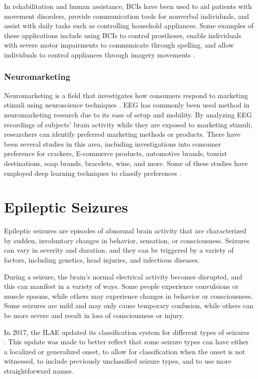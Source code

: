 In rehabilitation and human assistance, \glspl{BCI} have been used to aid patients with movement disorders, provide communication tools for nonverbal individuals, and assist with daily tasks such as controlling household appliances. Some examples of these applications include using \glspl{BCI} to control prostheses, enable individuals with severe motor impairments to communicate through spelling, and allow individuals to control appliances through imagery movements \cite{robinson_adaptive_2015}.

\subsubsection{Neuromarketing}
Neuromarketing is a field that investigates how consumers respond to marketing stimuli using neuroscience techniques \cite{lai_literature_2018}. 
\gls{EEG} has commonly been used method in neuromarketing research due to its ease of setup and mobility. By analyzing \gls{EEG} recordings of subjects' brain activity while they are exposed to marketing stimuli, researchers can identify preferred marketing methods or products. There have been several studies in this area, including investigations into consumer preference for crackers, E-commerce products, automotive brands, tourist destinations, soap brands, bracelets, wine, and more. Some of these studies have employed deep learning techniques to classify preferences \cite{bazzani_is_2020, khurana_survey_2021}.


\section{Epileptic Seizures}
Epileptic seizures are episodes of abnormal brain activity that are characterized by sudden, involuntary changes in behavior, sensation, or consciousness. Seizures can vary in severity and duration, and they can be triggered by a variety of factors, including genetics, head injuries, and infectious diseases.

During a seizure, the brain's normal electrical activity becomes disrupted, and this can manifest in a variety of ways. Some people experience convulsions or muscle spasms, while others may experience changes in behavior or consciousness. Some seizures are mild and may only cause temporary confusion, while others can be more severe and result in loss of consciousness or injury.

In 2017, the \gls{ILAE} updated its classification system for different types of seizures \cite{fisher_instruction_2017, fisher_operational_2017}. This update was made to better reflect that some seizure types can have either a localized or generalized onset, to allow for classification when the onset is not witnessed, to include previously unclassified seizure types, and to use more straightforward names.

